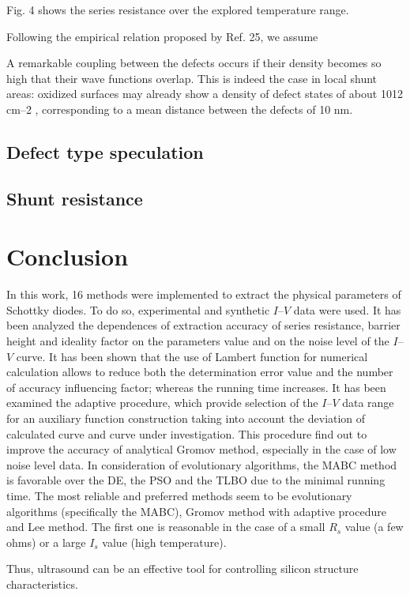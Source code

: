 \documentclass[aip,jap, amsmath,amssymb,reprint]{revtex4-1}
\begin{document}
Fig. 4 shows the  series resistance  over the explored temperature range.

Following the empirical relation proposed by Ref. 25, we assume


A remarkable coupling between the
defects occurs if their density becomes so high that their
wave functions overlap. This is indeed the case in local shunt
areas: oxidized surfaces may already show a density of
defect states of about 1012
cm–2
, corresponding to a mean
distance between the defects of 10 nm.






\subsection{Defect type speculation\label{DefectType}}

\subsection{Shunt resistance\label{Rsh}}


\section{Conclusion}
In this work, 16 methods were implemented to extract the physical parameters of Schottky diodes.
To do so, experimental and synthetic $I$--$V$ data were used.
It has been analyzed the dependences of extraction accuracy of series resistance, barrier height and ideality factor on the parameters value and on the noise level of the $I$--$V$ curve.
It has been shown that the use of Lambert function for numerical calculation allows to reduce both the determination error value and the number of accuracy influencing factor; whereas the running time increases.
It has been examined the adaptive procedure, which provide selection of the $I$--$V$ data range for an auxiliary function construction taking into account the deviation of calculated curve and curve under investigation.
This procedure find out to improve the accuracy of analytical Gromov method, especially in the case of low noise level data.
In consideration of evolutionary algorithms, the MABC method is favorable over the DE, the PSO and the TLBO due to the minimal running time.
The most reliable and preferred methods seem to be evolutionary algorithms (specifically the MABC), Gromov method with adaptive procedure and Lee method.
The first one is reasonable in the case of
a small $R_s$ value (a few ohms) or a large $I_s$ value (high temperature).

Thus, ultrasound can be an effective tool for controlling silicon structure characteristics.


\end{document}
